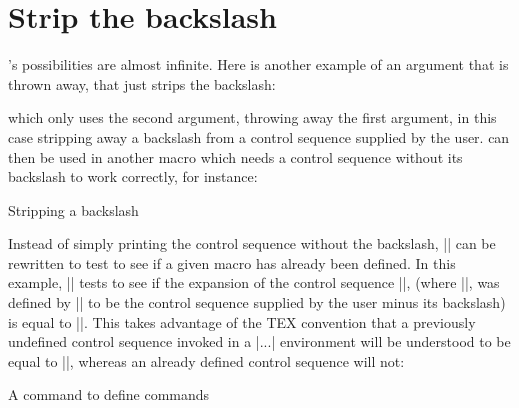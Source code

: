 \section*{Strip the backslash}

\tex's possibilities are almost infinite. Here is another example of
an argument that is thrown away\cite{amy1990}, that just strips the backslash:

\begin{teXXX}
\def\stripbackslash#1#2*{\def\one{#2}}
\end{teXXX}

which only uses the second argument, throwing away the
first argument, in this case stripping away a backslash
from a control sequence supplied by the user. 
can then be used in another macro which
needs a control sequence without its backslash to work
correctly, for instance:

\begin{texexample}{Stripping a backslash}{}
\def\stripbackslash#1#2*{\def\one{#2}}
\def\newdef#1{\expandafter
\stripbackslash\string#1* \one}

\newdef\testmacro
\end{texexample}



Instead of simply printing the control sequence without
the backslash, |\newdef| can be rewritten to test to see
if a given macro has already been defined. In this example,
|\newdef| tests to see if the expansion of the control
sequence |\csname\one\endcsname|, (where |\one|,
was defined by |\stripbackslash| to be the control sequence
supplied by the user minus its backslash) is equal
to |\relax|. This takes advantage of the TEX convention
that a previously undefined control sequence invoked in
a |\csname...\endcsname| environment will be understood
to be equal to |\relax|, whereas an already defined
control sequence will not:

\begin{texexample}{A command to define commands}{}
\def\newdef#1{%
  \expandafter\stripbackslash\string#1*
  \expandafter
  \ifx\csname\one\endcsname\relax
  \else %
    {\tt Sorry, \string#1 has already been
     defined. Please supply a new name.}
\fi}
\end{texexample}


